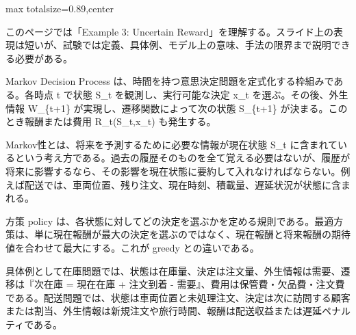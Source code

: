 \begin{minipage}[t]{0.58\textwidth}
\begin{adjustbox}{max totalsize={\textwidth}{0.89\textheight},center}
\begin{minipage}{\textwidth}\scriptsize
{}このページでは「Example 3: Uncertain Reward」を理解する。スライド上の表現は短いが、試験では定義、具体例、モデル上の意味、手法の限界まで説明できる必要がある。\par
Markov Decision Process は、時間を持つ意思決定問題を定式化する枠組みである。各時点 t で状態 S\_t を観測し、実行可能な決定 x\_t を選ぶ。その後、外生情報 W\_\{t+1\} が実現し、遷移関数によって次の状態 S\_\{t+1\} が決まる。このとき報酬または費用 R\_t(S\_t,x\_t) も発生する。\par
Markov性とは、将来を予測するために必要な情報が現在状態 S\_t に含まれているという考え方である。過去の履歴そのものを全て覚える必要はないが、履歴が将来に影響するなら、その影響を現在状態に要約して入れなければならない。例えば配送では、車両位置、残り注文、現在時刻、積載量、遅延状況が状態に含まれる。\par
方策 policy は、各状態に対してどの決定を選ぶかを定める規則である。最適方策は、単に現在報酬が最大の決定を選ぶのではなく、現在報酬と将来報酬の期待値を合わせて最大にする。これが greedy との違いである。\par
具体例として在庫問題では、状態は在庫量、決定は注文量、外生情報は需要、遷移は『次在庫 = 現在在庫 + 注文到着 - 需要』、費用は保管費・欠品費・注文費である。配送問題では、状態は車両位置と未処理注文、決定は次に訪問する顧客または割当、外生情報は新規注文や旅行時間、報酬は配送収益または遅延ペナルティである。\par

\end{minipage}
\end{adjustbox}
\end{minipage}
